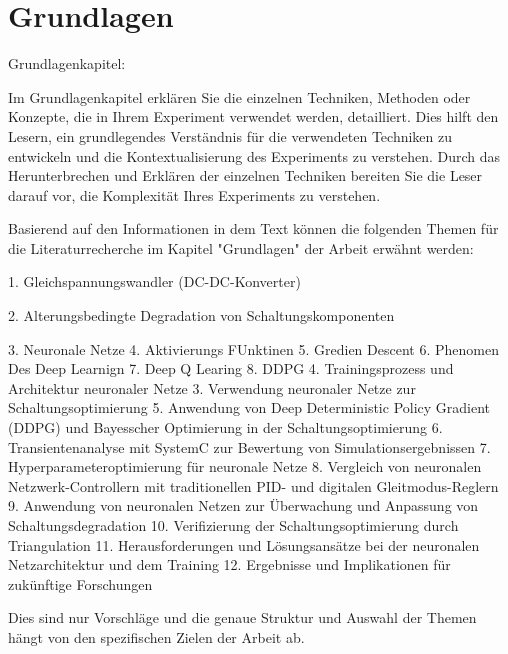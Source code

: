 \chapter{Grundlagen}

Grundlagenkapitel:

Im Grundlagenkapitel erklären Sie die einzelnen Techniken, Methoden oder Konzepte, die in Ihrem Experiment verwendet werden, detailliert. Dies hilft den Lesern, ein grundlegendes Verständnis für die verwendeten Techniken zu entwickeln und die Kontextualisierung des Experiments zu verstehen.
Durch das Herunterbrechen und Erklären der einzelnen Techniken bereiten Sie die Leser darauf vor, die Komplexität Ihres Experiments zu verstehen.

Basierend auf den Informationen in dem Text können die folgenden Themen für die Literaturrecherche im Kapitel "Grundlagen" der Arbeit erwähnt werden:


1. Gleichspannungswandler (DC-DC-Konverter)


2. Alterungsbedingte Degradation von Schaltungskomponenten

3. Neuronale Netze
4. Aktivierungs FUnktinen
5. Gredien Descent
6. Phenomen Des Deep Learnign
7. Deep Q Learing
8. DDPG
4. Trainingsprozess und Architektur neuronaler Netze
3. Verwendung neuronaler Netze zur Schaltungsoptimierung
5. Anwendung von Deep Deterministic Policy Gradient (DDPG) und Bayesscher Optimierung in der Schaltungsoptimierung
6. Transientenanalyse mit SystemC zur Bewertung von Simulationsergebnissen
7. Hyperparameteroptimierung für neuronale Netze
8. Vergleich von neuronalen Netzwerk-Controllern mit traditionellen PID- und digitalen Gleitmodus-Reglern
9. Anwendung von neuronalen Netzen zur Überwachung und Anpassung von Schaltungsdegradation
10. Verifizierung der Schaltungsoptimierung durch Triangulation
11. Herausforderungen und Lösungsansätze bei der neuronalen Netzarchitektur und dem Training
12. Ergebnisse und Implikationen für zukünftige Forschungen

Dies sind nur Vorschläge und die genaue Struktur und Auswahl der Themen hängt von den spezifischen Zielen der Arbeit ab.



